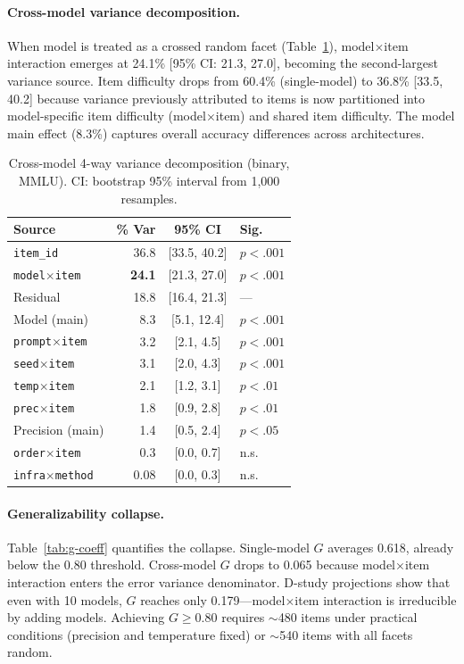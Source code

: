 \documentclass[letterpaper]{article}
\newcommand{\gcoeff}{\ensuremath{G}}
\newcommand{\pct}{\%}
\begin{document}
\paragraph{Cross-model variance decomposition.}
When model is treated as a crossed random facet (Table~\ref{tab:cross-model}), model$\times$item interaction emerges at 24.1\pct{} [95\pct{} CI: 21.3, 27.0], becoming the second-largest variance source.
Item difficulty drops from 60.4\pct{} (single-model) to 36.8\pct{} [33.5, 40.2] because variance previously attributed to items is now partitioned into model-specific item difficulty (model$\times$item) and shared item difficulty.
The model main effect (8.3\pct{}) captures overall accuracy differences across architectures.

\begin{table}[t]
\centering
\caption{Cross-model 4-way variance decomposition (binary, MMLU). CI: bootstrap 95\pct{} interval from 1,000 resamples.}
\label{tab:cross-model}
\small
\begin{tabular}{lrcl}
\toprule
Source & \pct{} Var & 95\pct{} CI & Sig. \\
\midrule
\texttt{item\_id}            & 36.8 & [33.5, 40.2] & $p<.001$ \\
\texttt{model$\times$item}   & \textbf{24.1} & [21.3, 27.0] & $p<.001$ \\
Residual                      & 18.8 & [16.4, 21.3] & --- \\
Model (main)                  & 8.3  & [5.1, 12.4]  & $p<.001$ \\
\texttt{prompt$\times$item}  & 3.2  & [2.1, 4.5]   & $p<.001$ \\
\texttt{seed$\times$item}    & 3.1  & [2.0, 4.3]   & $p<.001$ \\
\texttt{temp$\times$item}    & 2.1  & [1.2, 3.1]   & $p<.01$ \\
\texttt{prec$\times$item}    & 1.8  & [0.9, 2.8]   & $p<.01$ \\
Precision (main)              & 1.4  & [0.5, 2.4]   & $p<.05$ \\
\texttt{order$\times$item}   & 0.3  & [0.0, 0.7]   & n.s. \\
\texttt{infra$\times$method} & 0.08 & [0.0, 0.3]   & n.s. \\
\bottomrule
\end{tabular}
\end{table}

\paragraph{Generalizability collapse.}
Table~\ref{tab:g-coeff} quantifies the collapse.
Single-model $\gcoeff{}$ averages 0.618, already below the 0.80 threshold.
Cross-model $\gcoeff{}$ drops to 0.065 because model$\times$item interaction enters the error variance denominator.
D-study projections show that even with 10 models, $\gcoeff{}$ reaches only 0.179---model$\times$item interaction is irreducible by adding models.
Achieving $\gcoeff{} \geq 0.80$ requires $\sim$480 items under practical conditions (precision and temperature fixed) or $\sim$540 items with all facets random.
\end{document}
